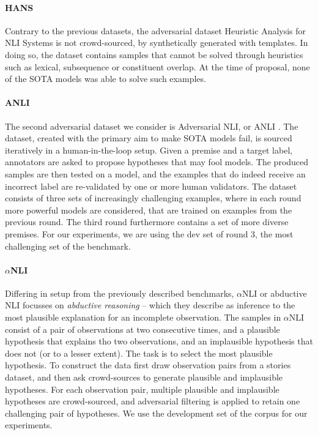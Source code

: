 \paragraph{HANS}
Contrary to the previous datasets, the adversarial dataset Heuristic Analysis for NLI Systems \citep[HANS,][]{mccoy-etal-2019-right} is not crowd-sourced, by synthetically generated with templates.
In doing so, the dataset contains samples that cannot be solved through heuristics such as lexical, subsequence or constituent overlap.
At the time of proposal, none of the SOTA models was able to solve such examples.

\paragraph{ANLI}
The second adversarial dataset we consider is Adversarial NLI, or ANLI \citep{nie-etal-2020-adversarial}.
The dataset, created with the primary aim to make SOTA models fail, is sourced iteratively in a human-in-the-loop setup.
Given a premise and a target label, annotators are asked to propose hypotheses that may fool models.
The produced samples are then tested on a model, and the examples that do indeed receive an incorrect label are re-validated by one or more human validators.
The dataset consists of three sets of increasingly challenging examples, where in each round more powerful models are considered, that are trained on examples from the previous round.
The third round furthermore contains a set of more diverse premises.
For our experiments, we are using the dev set of round 3, the most challenging set of the benchmark.

\paragraph{$\alpha$NLI}
Differing in setup from the previously described benchmarks, $\alpha$NLI or abductive NLI \citep{bhagavatula2020abductive} focusses on \emph{abductive reasoning} -- which they describe as inference to the most plausible explanation for an incomplete observation.
The samples in $\alpha$NLI consist of a pair of observations at two consecutive times, and a plausible hypothesis that explains tho two observations, and an implausible hypothesis that does not (or to a lesser extent).
The task is to select the most plausible hypothesis.
To construct the data \citet{bhagavatula2020abductive} first draw observation pairs from a stories dataset, and then ask crowd-sources to generate plausible and implausible hypotheses. 
For each observation pair, multiple plausible and implausible hypotheses are crowd-sourced, and adversarial filtering is applied to retain one challenging pair of hypotheses.
We use the development set of the corpus for our experiments.

